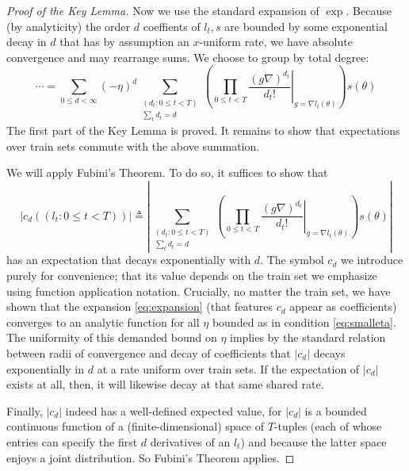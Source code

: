 \documentclass[openany, notitlepage, justified]{tufte-book}
\theoremstyle{plain}
\theoremstyle{definition}
\newcommand{\wrap}[1]{\left(#1\right)}
\newcommand{\wabs}[1]{\left|#1\right|}
\begin{document}
\begin{proof}[Proof of the Key Lemma]
            Now we use the standard expansion of $\exp$.  Because (by
            analyticity) the order $d$ coeffients of $l_t, s$ are bounded by
            some exponential decay in $d$ that has by assumption an $x$-uniform
            rate, we have absolute convergence and may rearrange sums.  We
            choose to group by total degree:
            \begin{equation} \label{eq:expansion}
                \cdots 
                =
                \sum_{0\leq d < \infty} (-\eta)^d
                \sum_{\substack{(d_t: 0\leq t<T) \\ \sum_t d_t = d}}
                \wrap{
                    \prod_{0 \leq t < T} \left.
                        \frac{(g \nabla)^{d_t}}{d_t!}
                    \right|_{g=\nabla l_t(\theta)}
                } s (\theta)
            \end{equation}
            The first part of the Key Lemma is proved.  It remains to show that
            expectations over train sets commute with the above summation.

            We will apply Fubini's Theorem.  To do so, it suffices to show that   
            $$
                \wabs{c_d((l_t: 0\leq t<T))} 
                \triangleq
                \wabs{
                    \sum_{\substack{(d_t: 0\leq t<T) \\ \sum_t d_t = d}}
                    \wrap{
                        \prod_{0 \leq t < T} \left.
                            \frac{(g \nabla)^{d_t}}{d_t!}
                        \right|_{g=\nabla l_t(\theta)}
                    } s (\theta)
                }
            $$
            has an expectation that decays exponentially with $d$.  The symbol
            $c_d$ we introduce purely for convenience; that its value depends
            on the train set we emphasize using function application
            notation.  Crucially, no matter the train set, we have shown
            that the expansion \ref{eq:expansion} (that features $c_d$ appear
            as coefficients) converges to an analytic function for all $\eta$
            bounded as in condition \ref{eq:smalleta}.  The uniformity of this
            demanded bound on $\eta$ implies by the standard relation between
            radii of convergence and decay of coefficients that $\wabs{c_d}$
            decays exponentially in $d$ at a rate uniform over train sets.
            If the expectation of $\wabs{c_d}$ exists at all, then, it will
            likewise decay at that same shared rate.
            
            Finally, $\wabs{c_d}$ indeed has a well-defined expected value, for
            $\wabs{c_d}$ is a bounded continuous function of a
            (finite-dimensional) space of $T$-tuples (each of whose entries can
            specify the first $d$ derivatives of an $l_t$) and because the
            latter space enjoys a joint distribution.  So Fubini's Theorem
            applies. 
        \end{proof}
\end{document}

